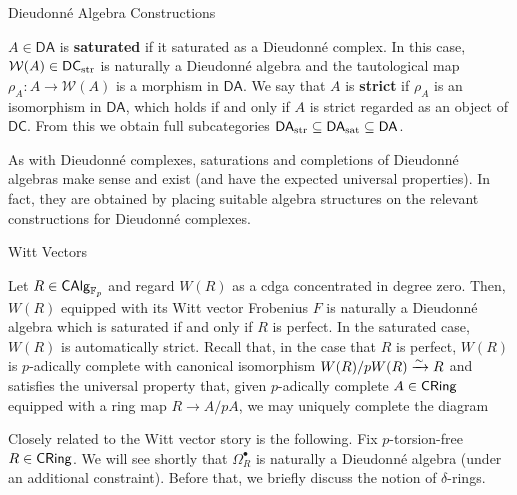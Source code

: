 \documentclass[aspectratio=1610]{beamer}
\newcommand{\DA}{\mathsf{DA}}
\newcommand{\DC}{\mathsf{DC}}
\newcommand{\sat}{\textup{sat}}
\newcommand{\str}{\textup{str}}
\newcommand{\W}{\mathcal{W}}
\begin{document}
\begin{frame}[fragile]{Dieudonn\'{e} Algebra Constructions}
\begin{definition}
$A\in\DA$ is \textbf{saturated} if it saturated as a Dieudonn\'{e} complex. In this case, $\W(A)\in\DC_{\str}$ is naturally a Dieudonn\'{e} algebra and the tautological map $\rho_A: A\to\W(A)$ is a morphism in $\DA$. We say that $A$ is \textbf{strict} if $\rho_A$ is an isomorphism in $\DA$, which holds if and only if $A$ is strict regarded as an object of $\DC$. From this we obtain full subcategories $\DA_{\str}\subset\DA_{\sat}\subset\DA$.
\end{definition}

As with Dieudonn\'{e} complexes, saturations and completions of Dieudonn\'{e} algebras make sense and exist (and have the expected universal properties). In fact, they are obtained by placing suitable algebra structures on the relevant constructions for Dieudonn\'{e} complexes.
\end{frame}

\begin{frame}[fragile]{Witt Vectors}
\begin{example}
Let $R\in\operatorname{\mathsf{CAlg}}_{\mathbb{F}_p}$ and regard $W(R)$ as a cdga concentrated in degree zero. Then, $W(R)$ equipped with its Witt vector Frobenius $F$ is naturally a Dieudonn\'{e} algebra which is saturated if and only if $R$ is perfect. In the saturated case, $W(R)$ is automatically strict. Recall that, in the case that $R$ is perfect, $W(R)$ is $p$-adically complete with canonical isomorphism $W(R)/pW(R)\xrightarrow{\sim}R$ and satisfies the universal property that, given $p$-adically complete $A\in\operatorname{\mathsf{CRing}}$ equipped with a ring map $R\to A/pA$, we may uniquely complete the diagram
\begin{center}
\end{center}
\end{example}

Closely related to the Witt vector story is the following. Fix $p$-torsion-free $R\in\operatorname{\mathsf{CRing}}$. We will see shortly that $\Omega_R^{\bullet}$ is naturally a Dieudonn\'{e} algebra (under an additional constraint). Before that, we briefly discuss the notion of $\delta$-rings. 
\end{frame}
\end{document}
